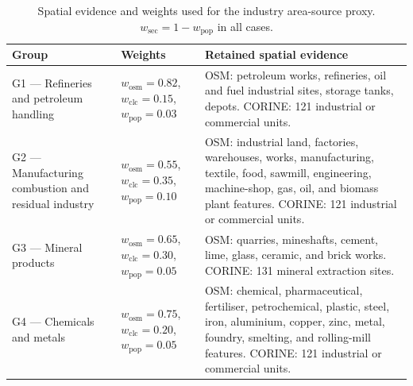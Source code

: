 \begin{table}[htbp]
  \centering
  \caption{Spatial evidence and weights used for the industry area-source proxy.
           $w_{\mathrm{sec}} = 1 - w_{\mathrm{pop}}$ in all cases.}
  \label{tab:industry-spatial-rules}
  \scriptsize
  \begin{tabular}{p{} p{} p{}}
    \toprule
    Group & Weights & Retained spatial evidence \\
    \midrule
    G1 --- Refineries and petroleum handling &
    $w_{\mathrm{osm}}=0.82$,\newline
    $w_{\mathrm{clc}}=0.15$,\newline
    $w_{\mathrm{pop}}=0.03$ &
    OSM: petroleum works, refineries, oil and fuel industrial sites, storage tanks,
    depots.\newline
    CORINE: 121 industrial or commercial units. \\[4pt]
    G2 --- Manufacturing combustion and residual industry &
    $w_{\mathrm{osm}}=0.55$,\newline
    $w_{\mathrm{clc}}=0.35$,\newline
    $w_{\mathrm{pop}}=0.10$ &
    OSM: industrial land, factories, warehouses, works, manufacturing, textile, food,
    sawmill, engineering, machine-shop, gas, oil, and biomass plant features.\newline
    CORINE: 121 industrial or commercial units. \\[4pt]
    G3 --- Mineral products &
    $w_{\mathrm{osm}}=0.65$,\newline
    $w_{\mathrm{clc}}=0.30$,\newline
    $w_{\mathrm{pop}}=0.05$ &
    OSM: quarries, mineshafts, cement, lime, glass, ceramic, and brick works.\newline
    CORINE: 131 mineral extraction sites. \\[4pt]
    G4 --- Chemicals and metals &
    $w_{\mathrm{osm}}=0.75$,\newline
    $w_{\mathrm{clc}}=0.20$,\newline
    $w_{\mathrm{pop}}=0.05$ &
    OSM: chemical, pharmaceutical, fertiliser, petrochemical, plastic, steel, iron,
    aluminium, copper, zinc, metal, foundry, smelting, and rolling-mill features.\newline
    CORINE: 121 industrial or commercial units. \\
    \bottomrule
  \end{tabular}
\end{table}


